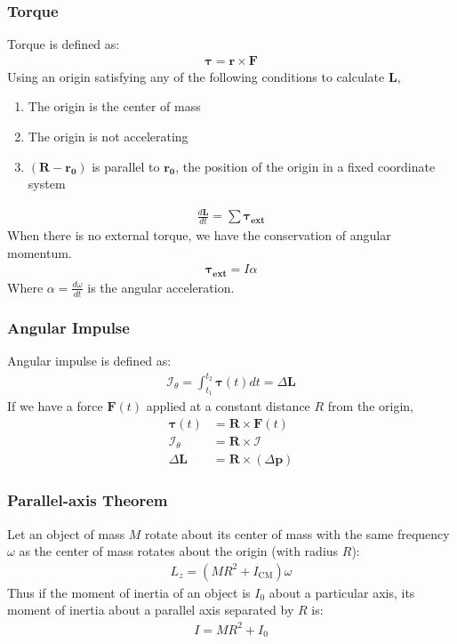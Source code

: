\documentclass[a4paper]{article}
\newcommand{\Imp}{\mathcal{I}}	       %
\newcommand{\ve}[1]{
  \ensuremath{\bm{#1}}}	               %
\begin{document}
\begin{multicols*}{2}
\subsubsection{Torque}
Torque is defined as:
\begin{align*}
  \ve{\tau}=\ve{r}\times\ve{F}
\end{align*}
Using an origin satisfying any of the following conditions to calculate $\ve{L}$,
\begin{enumerate}
\item The origin is the center of mass
\item The origin is not accelerating
\item $(\ve{R}-\ve{r_0})$ is parallel to $\ve{r_0}$, the position of the origin
  in a fixed coordinate system
\end{enumerate}
\begin{align*}
  \frac{d\ve{L}}{dt}=\sum \ve{\tau_\text{ext}}
\end{align*}
When there is no external torque, we have the conservation of angular momentum.
\begin{align*}
  \ve{\tau_\text{ext}}=I\alpha
\end{align*}
Where $\alpha=\frac{d\omega}{dt}$ is the angular acceleration.
\subsubsection{Angular Impulse}
Angular impulse is defined as:
\begin{align*}
  \Imp_\theta=\int_{t_1}^{t_2}\ve{\tau}(t)dt=\Delta\ve{L}
\end{align*}
If we have a force $\ve{F}(t)$ applied at a constant distance $R$ from the
origin,
\begin{align*}
  \ve{\tau}(t)&=\ve{R}\times\ve{F}(t) \\
  \Imp_\theta&=\ve{R}\times\Imp \\
  \Delta\ve{L}&=\ve{R}\times(\Delta\ve{p})
\end{align*}
\subsubsection{Parallel-axis Theorem}
Let an object of mass $M$ rotate about its center of mass with the same
frequency $\omega$ as the center of mass rotates about the origin (with radius
$R$):
\begin{align*}
  L_z=(MR^2+I_\text{CM})\omega
\end{align*}
Thus if the moment of inertia of an object is $I_0$ about a particular axis, its
moment of inertia about a parallel axis separated by $R$ is:
\begin{align*}
  I=MR^2+I_0
\end{align*}

\end{multicols*}
\end{document}
